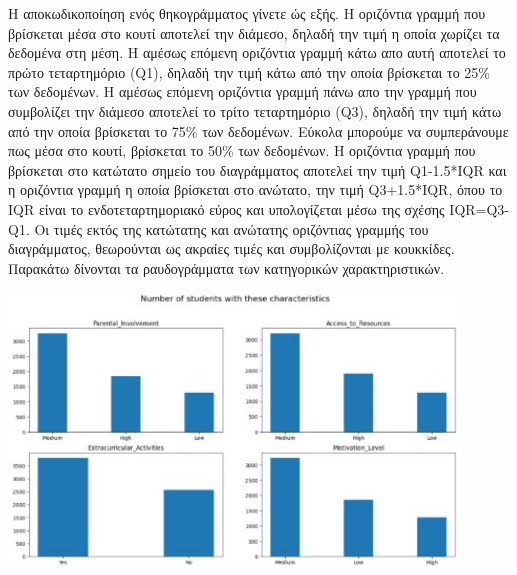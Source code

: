\documentclass[12pt]{article}
\begin{document}
Η αποκωδικοποίηση ενός θηκογράμματος γίνετε ώς εξής. Η οριζόντια γραμμή που βρίσκεται μέσα στο κουτί αποτελεί την διάμεσο, δηλαδή την τιμή η οποία χωρίζει τα δεδομένα στη μέση. Η αμέσως επόμενη οριζόντια γραμμή κάτω απο αυτή αποτελεί το πρώτο τεταρτημόριο (Q1), δηλαδή την τιμή κάτω από την οποία βρίσκεται το 25\% των δεδομένων. Η αμέσως επόμενη οριζόντια γραμμή πάνω απο την γραμμή που συμβολίζει την διάμεσο αποτελεί το τρίτο τεταρτημόριο (Q3), δηλαδή την τιμή κάτω από την οποία βρίσκεται το 75\% των δεδομένων. Εύκολα μπορούμε να συμπεράνουμε πως μέσα στο κουτί, βρίσκεται το 50\% των δεδομένων. Η οριζόντια γραμμή που βρίσκεται στο κατώτατο σημείο του διαγράμματος αποτελεί την τιμή Q1-1.5*IQR και η οριζόντια γραμμή η οποία βρίσκεται στο ανώτατο, την τιμή Q3+1.5*IQR, όπου το IQR είναι το ενδοτεταρτημοριακό εύρος και υπολογίζεται μέσω της σχέσης IQR=Q3-Q1. Οι τιμές εκτός της κατώτατης και ανώτατης οριζόντιας γραμμής του διαγράμματος, θεωρούνται ως ακραίες τιμές και συμβολίζονται με κουκκίδες.\\

\noindent Παρακάτω δίνονται τα ραυδογράμματα των κατηγορικών χαρακτηριστικών.

\begin{center}
    \includegraphics[width=0.9\textwidth]{./images/icon14.jpg}
    
\end{center}
\end{document}

